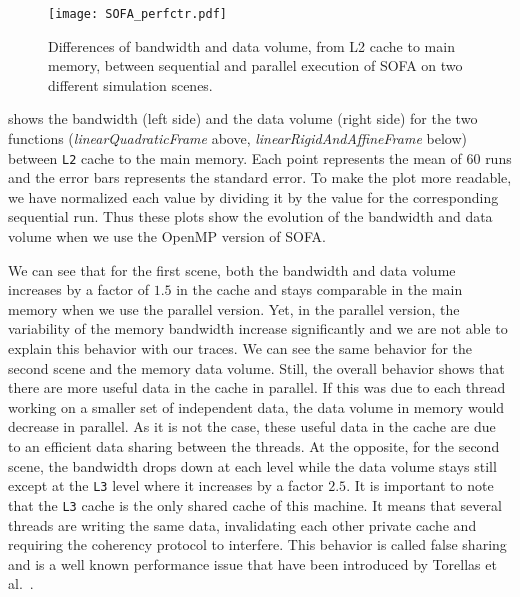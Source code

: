 \begin{figure}[htb]
    \centering
    \texttt{[image: SOFA\_perfctr.pdf]}
    \caption[SOFA likwid results.]{Differences of bandwidth and data volume, from L2 cache to main memory, between sequential and parallel execution of \gls{SOFA} on two different simulation scenes.
        \\
    }
    \label{fig:SOFA-perfctr}
\end{figure}

 shows the bandwidth (left side) and the data volume (right side) for the two functions (\emph{linearQuadraticFrame} above, \emph{linearRigidAndAffineFrame} below) between \texttt{L2} cache to the main memory.
Each point represents the mean of $60$ runs and the error bars represents the standard error.
To make the plot more readable, we have normalized each value by dividing it by the value for the corresponding sequential run.
Thus these plots show the evolution of the bandwidth and data volume when we use the \gls{OpenMP} version of \gls{SOFA}.

We can see that for the first scene, both the bandwidth and data volume increases by a factor of $1.5$ in the cache and stays comparable in the main memory when we use the parallel version.
Yet, in the parallel version, the variability of the memory bandwidth increase significantly
and we are not able to explain this behavior with our traces.
We can see the same behavior for the second scene and the memory data volume.
Still, the overall behavior shows that there are more useful data in the cache in parallel.
If this was due to each thread working on a smaller set of independent data, the data volume in memory would decrease in parallel.
As it is not the case, these useful data in the cache are due to an efficient data sharing between the threads.
At the opposite, for the second scene, the bandwidth drops down at each level while the data volume stays still except at the \texttt{L3} level where it increases by a factor $2.5$.
It is important to note that the \texttt{L3} cache is the only shared cache of this machine.
It means that several threads are writing the same data, invalidating each other private cache and requiring the coherency protocol to interfere.
This behavior is called false sharing and is a well known performance issue that have been introduced by Torellas et al.~\cite{Torrellas94False}.

